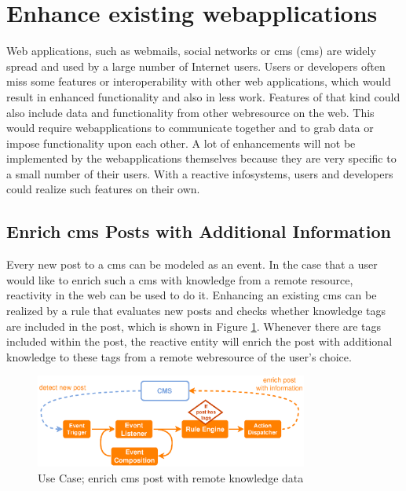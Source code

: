 \section{Enhance existing \glspl{webapplication}}
Web applications, such as webmails, social networks or \textrm{\acrlong{cms} (\acrshort{cms})} are widely spread and used by a large number of Internet users.
Users or developers often miss some features or interoperability with other web applications, which would result in enhanced functionality and also in less work.
Features of that kind could also include data and functionality from other \textrm{\gls{webresource}} on the web.
This would require \textrm{\glspl{webapplication}} to communicate together and to grab data or impose functionality upon each other.
A lot of enhancements will not be implemented by the \textrm{\glspl{webapplication}} themselves because they are very specific to a small number of their users.
With a reactive \textrm{\glspl{infosystem}}, users and developers could realize such features on their own.



\subsection{Enrich \acrlong{cms} Posts with Additional Information}
Every new post to a \textrm{\acrlong{cms}} can be modeled as an event.
In the case that a user would like to enrich such a \textrm{\acrshort{cms}} with knowledge from a remote resource, reactivity in the \textrm{\gls{web}} can be used to do it.
Enhancing an existing \textrm{\acrshort{cms}} can be realized by a rule that evaluates new posts and checks whether knowledge tags are included in the post, which is shown in Figure \ref{fig:ProBinderAnnotations}.
Whenever there are tags included within the post, the reactive entity will enrich the post with additional knowledge to these tags from a remote \textrm{\gls{webresource}} of the user's choice.
\begin{figure}[!ht]
  \centering
  \includegraphics[width=0.8\textwidth]{figures/ProBinderAnnotations}
  \caption{Use Case; enrich \acrshort{cms} post with remote knowledge data}
  \label{fig:ProBinderAnnotations}
\end{figure}



